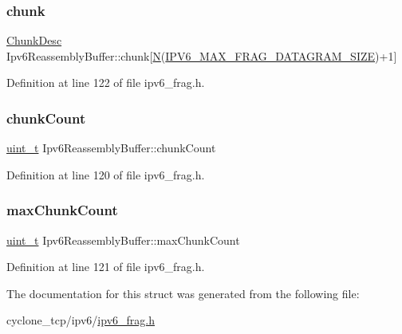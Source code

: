 \subsubsection{\texorpdfstring{chunk}{chunk}}
{\footnotesize\ttfamily \hyperlink{structChunkDesc}{Chunk\+Desc} Ipv6\+Reassembly\+Buffer\+::chunk\mbox{[}\hyperlink{net__mem_8h_a5d7f6248b8dd365190e7562d4e14a4f3}{N}(\hyperlink{net__config_8h_ac016101236364e74fc7e0729bf2d8d16}{I\+P\+V6\+\_\+\+M\+A\+X\+\_\+\+F\+R\+A\+G\+\_\+\+D\+A\+T\+A\+G\+R\+A\+M\+\_\+\+S\+I\+ZE})+1\mbox{]}}



Definition at line 122 of file ipv6\+\_\+frag.\+h.

\mbox{\label{structIpv6ReassemblyBuffer_ae4cd44718d4c80b83fe7e0decdb51cc3}} 
\subsubsection{\texorpdfstring{chunk\+Count}{chunkCount}}
{\footnotesize\ttfamily \hyperlink{compiler__port_8h_a12a1e9b3ce141648783a82445d02b58d}{uint\+\_\+t} Ipv6\+Reassembly\+Buffer\+::chunk\+Count}



Definition at line 120 of file ipv6\+\_\+frag.\+h.

\mbox{\label{structIpv6ReassemblyBuffer_a78933f1f92c2e1c7d19cae869fa09b45}} 
\subsubsection{\texorpdfstring{max\+Chunk\+Count}{maxChunkCount}}
{\footnotesize\ttfamily \hyperlink{compiler__port_8h_a12a1e9b3ce141648783a82445d02b58d}{uint\+\_\+t} Ipv6\+Reassembly\+Buffer\+::max\+Chunk\+Count}



Definition at line 121 of file ipv6\+\_\+frag.\+h.



The documentation for this struct was generated from the following file\+:\begin{DoxyCompactItemize}
\item 
cyclone\+\_\+tcp/ipv6/\hyperlink{ipv6__frag_8h}{ipv6\+\_\+frag.\+h}\end{DoxyCompactItemize}
